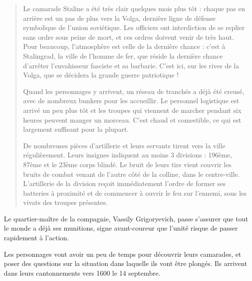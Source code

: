 \documentclass{report}
\begin{document}
\begin{multicols}{2}
\begin{quotation}
Le camarade Staline a été très clair quelques mois plus tôt : chaque pas en arrière est un pas de plus vers la Volga, dernière ligne de défense symbolique de l'union soviétique. Les officiers ont interdiction de se replier sans ordre sous peine de mort, et ces ordres doivent venir de très haut. Pour beaucoup, l'atmosphère est celle de la dernière chance : c'est à Stalingrad, la ville de l'homme de fer, que réside la dernière chance d'arrêter l'envahisseur fasciste et sa barbarie. C'est ici, sur les rives de la Volga, que se décidera la grande guerre patriotique !

Quand les personnages y arrivent, un réseau de tranchés  a déjà été creusé, avec de nombreux bunkers pour les accueillir. Le personnel logistique est arrivé un peu plus tôt et les troupes qui viennent de marcher pendant six heures peuvent manger un morceau. C'est chaud et comestible, ce qui est largement suffisant pour la plupart.

De nombreuses pièces d'artillerie et leurs servants tirent vers la ville régulièrement. Leurs insignes indiquent au moins 3 divisions : 196ème, 87ème et le 23ème corps blindé. Le bruit de leurs tirs vient couvrir les bruits de combat venant de l'autre côté de la colline, dans le centre-ville. L'artillerie de la division reçoit immédiatement l'ordre de former ses batteries à proximité et de commencer à ouvrir le feu sur l'ennemi, sous les vivats des troupes présentes.
\end{quotation}
 Le quartier-maître de la compagnie, Vassily Grigoryevich, passe s'assurer que tout le monde a déjà ses munitions, signe avant-coureur que l'unité risque de passer rapidement à l'action.

Les personnages vont avoir un peu de temps pour découvrir leurs camarades, et poser des questions sur la situation dans laquelle ils vont être plongés. Ils arrivent dans leurs cantonnements vers 1600 le 14 septembre.


\end{multicols}
\end{document}
